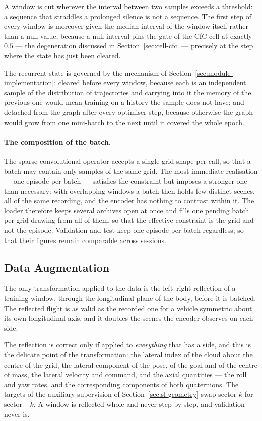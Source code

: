 A window is cut wherever the interval between two samples exceeds a threshold: a
sequence that straddles a prolonged silence is not a sequence. The first step of
every window is moreover given the median interval of the window itself rather
than a null value, because a null interval pins the gate of the CfC cell at
exactly $0.5$ --- the degeneration discussed in Section~\ref{sec:cell-cfc} ---
precisely at the step where the state has just been cleared.

The recurrent state is governed by the mechanism of
Section~\ref{sec:module-implementation}: cleared before every window, because
each is an independent sample of the distribution of trajectories and carrying
into it the memory of the previous one would mean training on a history the
sample does not have; and detached from the graph after every optimiser step,
because otherwise the graph would grow from one mini-batch to the next until it
covered the whole epoch.

\paragraph{The composition of the batch.}
The sparse convolutional operator accepts a single grid shape per call, so that
a batch may contain only samples of the same grid. The most immediate
realisation --- one episode per batch --- satisfies the constraint but imposes a
stronger one than necessary: with overlapping windows a batch then holds few
distinct scenes, all of the same recording, and the encoder has nothing to
contrast within it. The loader therefore keeps several archives open at once and
fills one pending batch per grid drawing from all of them, so that the effective
constraint is the grid and not the episode. Validation and test keep one episode
per batch regardless, so that their figures remain comparable across sessions.

\subsection{Data Augmentation}
\label{sec:sl-augmentation}

The only transformation applied to the data is the left--right reflection of a
training window, through the longitudinal plane of the body, before it is
batched. The reflected flight is as valid as the recorded one for a vehicle
symmetric about its own longitudinal axis, and it doubles the scenes the encoder
observes on each side.

The reflection is correct only if applied to \emph{everything} that has a side,
and this is the delicate point of the transformation: the lateral index of the
cloud about the centre of the grid, the lateral component of the pose, of the
goal and of the centre of mass, the lateral velocity and command, and the axial
quantities --- the roll and yaw rates, and the corresponding components of both
quaternions. The targets of the auxiliary supervision of
Section~\ref{sec:sl-geometry} swap sector $k$ for sector $-k$. A window is
reflected whole and never step by step, and validation never is.

